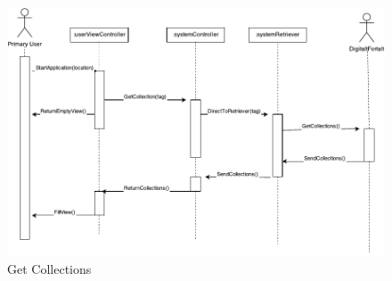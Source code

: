 \begin{figure}[!h]
\begin{center}
\includegraphics[scale=1]{Get-Collections}
\caption{Get Collections}
\end{center}
\end{figure}